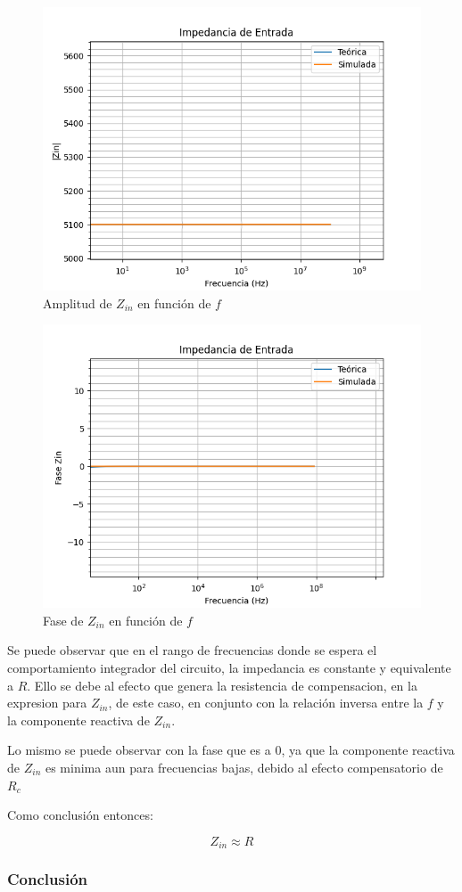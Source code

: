 \begin{figure}[H]
    \centering 
    \includegraphics [scale=0.6] {../Ejercicio3-CircuitoIntegradoresyDerivadores/Imagenes/zin-compensado-amplitud.png} 
    \caption{Amplitud de $Z_{in}$ en función de $f$}
    \label{fig:emptyPlotTool}
\end{figure}

\begin{figure}[H]
    \centering 
    \includegraphics [scale=0.6] {../Ejercicio3-CircuitoIntegradoresyDerivadores/Imagenes/zin-compensado-fase.png} 
    \caption{Fase de $Z_{in}$ en función de $f$ }
    \label{fig:emptyPlotTool}
\end{figure}

Se puede observar que en el rango de frecuencias donde se espera el comportamiento integrador del circuito, la impedancia es constante
y equivalente a $R$. Ello se debe al efecto que genera la resistencia de compensacion, en la expresion para $Z_{in}$, de este caso, en conjunto con 
la relación inversa entre la $f$ y la componente reactiva de $Z_{in}$.

Lo mismo se puede observar con la fase que es a 0, ya que la componente reactiva de $Z_{in}$ es minima aun para frecuencias bajas, debido al efecto
compensatorio de $R_c$

Como conclusión entonces:

$$Z_{in} \approx R$$

\subsubsection{Conclusión}